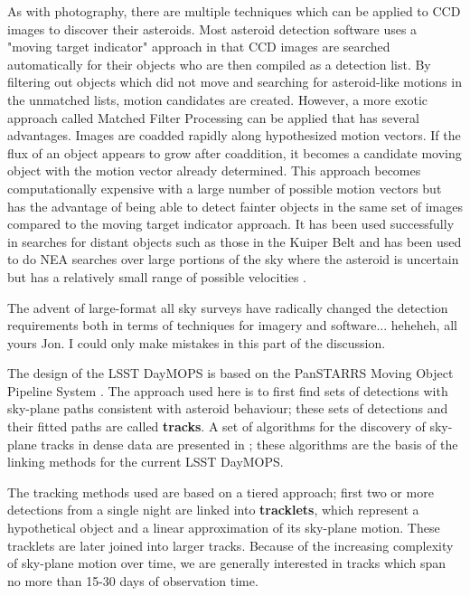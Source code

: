 As with photography, there are multiple techniques which can be
applied to CCD images to discover their asteroids.  Most asteroid
detection software uses a "moving target indicator" approach in that
CCD images are searched automatically for their objects who are then
compiled as a detection list.  By filtering out objects which did not
move and searching for asteroid-like motions in the unmatched lists,
motion candidates are created.  However, a more exotic approach called
Matched Filter Processing \citep{2005AJ....130.1951G} can be applied
that has several advantages.  Images are coadded rapidly along
hypothesized motion vectors.  If the flux of an object appears to grow
after coaddition, it becomes a candidate moving object with the motion
vector already determined.  This approach becomes computationally
expensive with a large number of possible motion vectors but has the
advantage of being able to detect fainter objects in the same set of
images compared to the moving target indicator approach.  It has been
used successfully in searches for distant objects such as those in the
Kuiper Belt \citep{BG, MB} and has been used to do NEA searches over
large portions of the sky where the asteroid is uncertain but has a
relatively small range of possible velocities
\citep{2005AJ....130.1951G}.

The advent of large-format all sky surveys have radically changed the
detection requirements both in terms of techniques for imagery and
software...  heheheh, all yours Jon.  I could only make mistakes in
this part of the discussion.


The design of the LSST DayMOPS is based on the PanSTARRS Moving Object
Pipeline System \citep{psMOPSDesign}.  The approach used here is to
first find sets of detections with sky-plane paths consistent with
asteroid behaviour; these sets of detections and their fitted paths
are called \textbf{tracks}.  A set of algorithms for the discovery of
sky-plane tracks in dense data are presented in
\citet{Kubica:2005:MTA:1081870.1081889}; these algorithms are the
basis of the linking methods for the current LSST DayMOPS.



The tracking methods used are based on a tiered approach; first two or
more detections from a single night are linked into
\textbf{tracklets}, which represent a hypothetical object and a linear
approximation of its sky-plane motion.  These tracklets are later
joined into larger tracks. Because of the increasing complexity of
sky-plane motion over time, we are generally interested in tracks
which span no more than 15-30 days of observation time.

